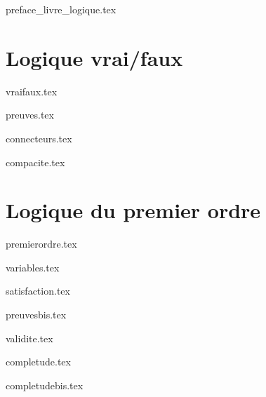 \documentclass[11pt]{report}
\begin{document}
	

\renewcommand{\contentsname}{Sommaire}

{preface_livre_logique.tex}
\debutchapitres
{}



\clearemptydoublepage



\part{Logique vrai/faux}

{vraifaux.tex}

{preuves.tex}

{connecteurs.tex}

{compacite.tex}



\part{Logique du premier ordre}

{premierordre.tex}

{variables.tex}
	
{satisfaction.tex}

{preuvesbis.tex}

{validite.tex}

{completude.tex}

{completudebis.tex}	


\end{document}
